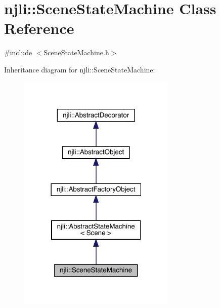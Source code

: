 \hypertarget{classnjli_1_1_scene_state_machine}{}\section{njli\+:\+:Scene\+State\+Machine Class Reference}
\label{classnjli_1_1_scene_state_machine}


{\ttfamily \#include $<$Scene\+State\+Machine.\+h$>$}



Inheritance diagram for njli\+:\+:Scene\+State\+Machine\+:\nopagebreak
\begin{figure}[H]
\begin{center}
\leavevmode
\includegraphics[width=213pt]{classnjli_1_1_scene_state_machine__inherit__graph}
\end{center}
\end{figure}


